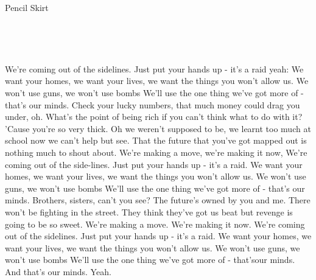 \begin{song}{Pencil Skirt}{

	\mbox{ \AMaj \EMaj \Fshm \DMaj \DSeven}


	\mbox{ \GMaj \GMajSeven \GSeven \CMaj \CMajSeven \CSeven }
	
}
\begin{SongVerse}
		We're coming out of the sidelines. 
		Just put your hands up - it's a raid yeah: 
		We want your homes, we want your lives, 
		we want the things you won't allow us. 
		We won't use guns, we won't use bombs
		We'll use the one thing we've got more of - that's our minds. 
		Check your lucky numbers, that much money could drag you under, oh. 
		What's the point of being rich if you can't think what to do with it? 
		'Cause you're so very thick. 
		Oh we weren't supposed to be, we learnt too much at school now 
		we can't help but see. 
		That the future that you've got mapped out is nothing much to shout about. 
		We're making a move, we're making it now,
		We're coming out of the side-lines. 
		Just put your hands up - it's a raid. 
		We want your homes, we want your lives,
		we want the things you won't allow us. 
		We won't use guns, we won't use bombs
		We'll use the one thing we've got more of - that's our minds. 
		Brothers, sisters, can't you see? 
		The future's owned by you and me. 
		There won't be fighting in the street. 
		They think they've got us beat but revenge is going to be so sweet. 
		We're making a move. We're making it now. 
		We're coming out of the sidelines. 
		Just put your hands up - it's a raid. 
		We want your homes, we want your lives, 
		we want the things you won't allow us. 
		We won't use guns, we won't use bombs
		We'll use the one thing we've got more of - that'sour minds. 
		And that's our minds. Yeah. 
	 \end{SongVerse}

\end{song}